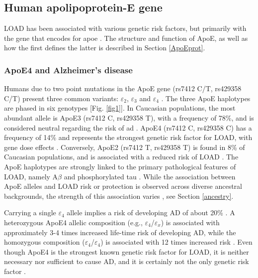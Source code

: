 \documentclass{amsart}
\begin{document}
\subsection{Human apolipoprotein-E gene}
LOAD has been associated with various genetic risk factors, but primarily with the gene that encodes for \acrfull{apoe} \cite{Corder1993GeneFamilies}. The structure and function of ApoE, as well as how the first defines the latter is described in Section \ref{ApoEprot}.

\subsubsection{ApoE4 and Alzheimer's disease}
Humans due to two point mutations in the ApoE gene (rs7412 C/T, rs429358 C/T) present three common variants: $\varepsilon_2$, $\varepsilon_3$ and $\varepsilon_4$ \cite{Husain2021APOETherapeutics, Yang2023ApolipoproteinDisease}. The three ApoE haplotypes are phased in six genotypes [Fig. \ref{fig1}]. In Caucasian populations, the most abundant allele is ApoE3 (rs7412 C, rs429358 T), with a frequency of 78\%, and is considered neutral regarding the risk of \acrshort{ad} \cite{Liu2013ApolipoproteinTherapy}. ApoE4 (rs7412 C, rs429358 C) has a frequency of 14\% and represents the strongest genetic risk factor for LOAD, with gene dose effects \cite{Strittmatter1993ApolipoproteinDisease}. Conversely, ApoE2 (rs7412 T, rs429358 T) is found in 8\% of Caucasian populations, and is associated with a reduced risk of LOAD \cite{Liu2013ApolipoproteinTherapy}. The ApoE haplotypes are strongly linked to the primary pathological features of LOAD, namely A$\beta$ and phosphorylated tau \cite{Deming2017Genome-wideModifiers}. While the association between ApoE alleles and LOAD risk or protection is observed across diverse ancestral backgrounds, the strength of this association varies \cite{Belloy2019AForward, Farrer1997EffectsMeta-analysis}, see Section \ref{ancestry}.

Carrying a single $\varepsilon_4$ allele implies a risk of developing AD of about 20\% \cite{Bookheimer2009APOE4GA}. A heterozygous ApoE4 allelic composition (e.g., $\varepsilon_4$/$\varepsilon_x$) is associated with approximately 3-4 times increased life-time risk of developing AD, while the homozygous composition ($\varepsilon_4$/$\varepsilon_4$) is associated with 12 times increased risk \cite{Kim2009TheRO}. Even though ApoE4 is the strongest known genetic risk factor for LOAD, it is neither necessary nor sufficient to cause AD, and it is certainly not the only genetic risk factor \cite{SerranoPozo2019IsAD}.
\end{document}
